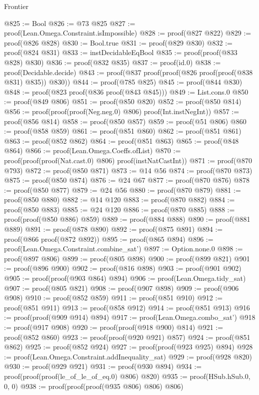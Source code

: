 \begin{lexlean}{Frontier}
\begin{coremodule}
@825 := Bool
@826 := @73 @825
@827 := proof(Lean.Omega.Constraint.isImpossible)
@828 := proof(@827 @822)
@829 := proof(@826 @828)
@830 := Bool.true
@831 := proof(@829 @830)
@832 := proof(@824 @831)
@833 := instDecidableEqBool
@835 := proof(proof(@833 @828) @830)
@836 := proof(@832 @835)
@837 := proof(id.{0})
@838 := proof(Decidable.decide)
@843 := proof(@837 proof(proof(@826 proof(proof(@838 @831) @835)) @830))
@844 := proof(@785 @825)
@845 := proof(@844 @830)
@848 := proof(@823 proof(@836 proof(@843 @845)))
@849 := List.cons.{0}
@850 := proof(@849 @806)
@851 := proof(@850 @820)
@852 := proof(@850 @814)
@856 := proof(proof(proof(Neg.neg.{0}) @806) proof(Int.instNegInt))
@857 := proof(@856 @814)
@858 := proof(@850 @857)
@859 := proof(@51 @806)
@860 := proof(@858 @859)
@861 := proof(@851 @860)
@862 := proof(@851 @861)
@863 := proof(@852 @862)
@864 := proof(@851 @863)
@865 := proof(@848 @864)
@866 := proof(Lean.Omega.Coeffs.ofList)
@870 := proof(proof(proof(Nat.cast.{0}) @806) proof(instNatCastInt))
@871 := proof(@870 @793)
@872 := proof(@850 @871)
@873 := @14 @56
@874 := proof(@870 @873)
@875 := proof(@850 @874)
@876 := @24 @67
@877 := proof(@870 @876)
@878 := proof(@850 @877)
@879 := @24 @56
@880 := proof(@870 @879)
@881 := proof(@850 @880)
@882 := @14 @120
@883 := proof(@870 @882)
@884 := proof(@850 @883)
@885 := @24 @120
@886 := proof(@870 @885)
@888 := proof(proof(@850 @886) @859)
@889 := proof(@884 @888)
@890 := proof(@881 @889)
@891 := proof(@878 @890)
@892 := proof(@875 @891)
@894 := proof(@866 proof(@872 @892))
@895 := proof(@865 @894)
@896 := proof(Lean.Omega.Constraint.combine_sat')
@897 := Option.none.{0}
@898 := proof(@897 @806)
@899 := proof(@805 @898)
@900 := proof(@899 @821)
@901 := proof(@896 @900)
@902 := proof(@816 @898)
@903 := proof(@901 @902)
@905 := proof(proof(@903 @864) @894)
@906 := proof(Lean.Omega.tidy_sat)
@907 := proof(@805 @821)
@908 := proof(@907 @898)
@909 := proof(@906 @908)
@910 := proof(@852 @859)
@911 := proof(@851 @910)
@912 := proof(@851 @911)
@913 := proof(@858 @912)
@914 := proof(@851 @913)
@916 := proof(proof(@909 @914) @894)
@917 := proof(Lean.Omega.combo_sat')
@918 := proof(@917 @908)
@920 := proof(proof(@918 @900) @814)
@921 := proof(@852 @860)
@923 := proof(proof(@920 @921) @857)
@924 := proof(@851 @862)
@925 := proof(@852 @924)
@927 := proof(proof(@923 @925) @894)
@928 := proof(Lean.Omega.Constraint.addInequality_sat)
@929 := proof(@928 @820)
@930 := proof(@929 @921)
@931 := proof(@930 @894)
@934 := proof(proof(proof(le_of_le_of_eq.{0}) @806) @820)
@935 := proof(HSub.hSub.{0, 0, 0})
@938 := proof(proof(proof(@935 @806) @806) @806)

\end{coremodule}
\end{lexlean}
